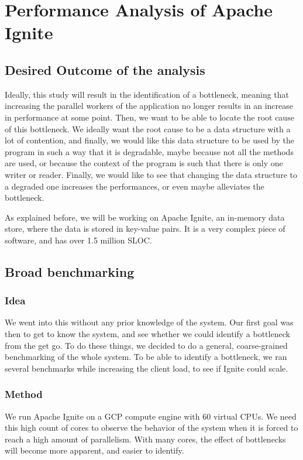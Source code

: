 \documentclass[conference]{IEEEtran}
\begin{document}
\bigbreak 

\section{Performance Analysis of Apache Ignite}
\subsection{Desired Outcome of the analysis}
Ideally, this study will result in the identification of a bottleneck, meaning that increasing the parallel workers of the application no longer results in an increase in performance at some point. Then, we want to be able to locate the root cause of this bottleneck. We ideally want the root cause to be a data structure with a lot of contention, and finally, we would like this data structure to be used by the program in such a way that it is degradable, maybe because not all the methods are used, or because the context of the program is such that there is only one writer or reader. Finally, we would like to see that changing the data structure to a degraded one increases the performances, or even maybe alleviates the bottleneck.

As explained before, we will be working on Apache Ignite, an in-memory data store, where the data is stored in key-value pairs. It is a very complex piece of software, and has over 1.5 million SLOC.

\subsection{Broad benchmarking}
\subsubsection{Idea}
We went into this without any prior knowledge of the system. Our first goal was then to get to know the system, and see whether we could identify a bottleneck from the get go. To do these things, we decided to do a general, coarse-grained benchmarking of the whole system. To be able to identify a bottleneck, we ran several benchmarks while increasing the client load, to see if Ignite could scale.
\subsubsection{Method}
We run Apache Ignite on a GCP compute engine with 60 virtual CPUs. We need this high count of cores to observe the behavior of the system when it is forced to reach a high amount of parallelism. With many cores, the effect of bottlenecks will become more apparent, and easier to identify.
\end{document}
